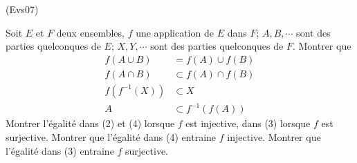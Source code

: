 \begin{tiny}(Evs07)\end{tiny} Soit $E$ et $F$ deux ensembles, $f$ une application de $E$ dans $F$; $A, B, \cdots $ sont des parties quelconques de $E$; $X, Y, \cdots$ sont des parties quelconques de $F$. Montrer que
\begin{eqnarray}
f(A\cup B) &= f(A)\cup f(B) \\
f(A\cap B) &\subset f(A)\cap f(B) \\
f(f^{-1}(X)) &\subset X \\
A &\subset f^{-1}(f(A))
\end{eqnarray}
Montrer l'{\'e}galit{\'e} dans (2) et (4) lorsque $f$ est injective, dans (3) lorsque $f$ est surjective. Montrer que l'égalité dans (4) entraine $f$ injective. Montrer que l'égalité dans (3) entraine $f$ surjective.